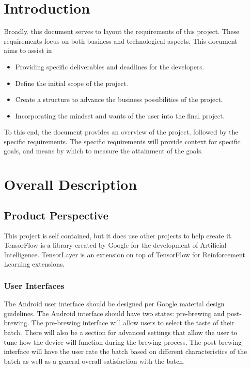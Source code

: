 \documentclass[draftclsnofoot,onecolumn,letterpaper,10pt]{IEEEtran}
\begin{document}
\section{Introduction}
Broadly, this document serves to layout the requirements of this project.
These requirements focus on both business and technological aspects.
This document aims to assist in
\begin{itemize}
	\item Providing specific deliverables and deadlines for the developers.
	\item Define the initial scope of the project.
	\item Create a structure to advance the business possibilities of the project.
	\item Incorporating the mindset and wants of the user into the final project.
\end{itemize}
To this end, the document provides an overview of the project, followed by the specific requirements.
The specific requirements will provide context for specific goals, and means by which to 
measure the attainment of the goals.

\section{Overall Description}
\subsection{Product Perspective}
This project is self contained, but it does use other projects to help create it.
TensorFlow is a library created by Google for the development of Artificial Intelligence.
TensorLayer is an extension on top of TensorFlow for Reinforcement Learning extensions.

\subsubsection{User Interfaces}
The Android user interface should be designed per Google material design guidelines.
The Android interface should have two states: pre-brewing and post-brewing.
The pre-brewing interface will allow users to select the taste of their batch.
There will also be a section for advanced settings that allow the user to tune how the
device will function during the brewing process.
The post-brewing interface will have the user rate the batch based on different 
characteristics of the batch as well as a general overall satisfaction with the batch.
\end{document}

